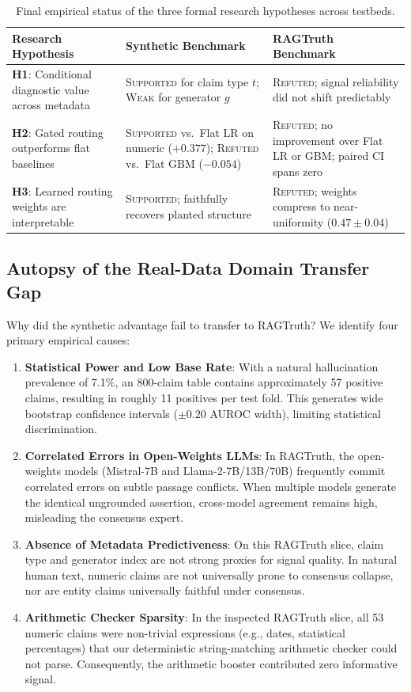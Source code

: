 \documentclass[pdflatex,sn-mathphys,Numbered]{sn-jnl}
\begin{document}
\begin{table}[htbp]
\caption{Final empirical status of the three formal research hypotheses across testbeds.}\label{tab:hyp_status}
\footnotesize
\setlength{\tabcolsep}{4pt}
\begin{tabular}{@{}p{3.2cm}p{4.2cm}p{4.2cm}@{}}
\toprule
\textbf{Research Hypothesis} & \textbf{Synthetic Benchmark} & \textbf{RAGTruth Benchmark} \\
\midrule
\textbf{H1}: Conditional diagnostic value across metadata & \textsc{Supported} for claim type $t$; \textsc{Weak} for generator $g$ & \textsc{Refuted}; signal reliability did not shift predictably \\
\textbf{H2}: Gated routing outperforms flat baselines & \textsc{Supported} vs.\ Flat LR on numeric ($+0.377$); \textsc{Refuted} vs.\ Flat GBM ($-0.054$) & \textsc{Refuted}; no improvement over Flat LR or GBM; paired CI spans zero \\
\textbf{H3}: Learned routing weights are interpretable & \textsc{Supported}; faithfully recovers planted structure & \textsc{Refuted}; weights compress to near-uniformity ($0.47 \pm 0.04$) \\
\bottomrule
\end{tabular}
\end{table}

\subsection{Autopsy of the Real-Data Domain Transfer Gap}\label{subsec:autopsy}

Why did the synthetic advantage fail to transfer to RAGTruth? We identify four primary empirical causes:
\begin{enumerate}
    \item \textbf{Statistical Power and Low Base Rate}: With a natural hallucination prevalence of 7.1\%, an 800-claim table contains approximately 57 positive claims, resulting in roughly 11 positives per test fold. This generates wide bootstrap confidence intervals ($\pm 0.20$ AUROC width), limiting statistical discrimination.
    \item \textbf{Correlated Errors in Open-Weights LLMs}: In RAGTruth, the open-weights models (Mistral-7B and Llama-2-7B/13B/70B) frequently commit correlated errors on subtle passage conflicts. When multiple models generate the identical ungrounded assertion, cross-model agreement remains high, misleading the consensus expert.
    \item \textbf{Absence of Metadata Predictiveness}: On this RAGTruth slice, claim type and generator index are not strong proxies for signal quality. In natural human text, numeric claims are not universally prone to consensus collapse, nor are entity claims universally faithful under consensus.
    \item \textbf{Arithmetic Checker Sparsity}: In the inspected RAGTruth slice, all 53 numeric claims were non-trivial expressions (e.g., dates, statistical percentages) that our deterministic string-matching arithmetic checker could not parse. Consequently, the arithmetic booster contributed zero informative signal.
\end{enumerate}
\end{document}

